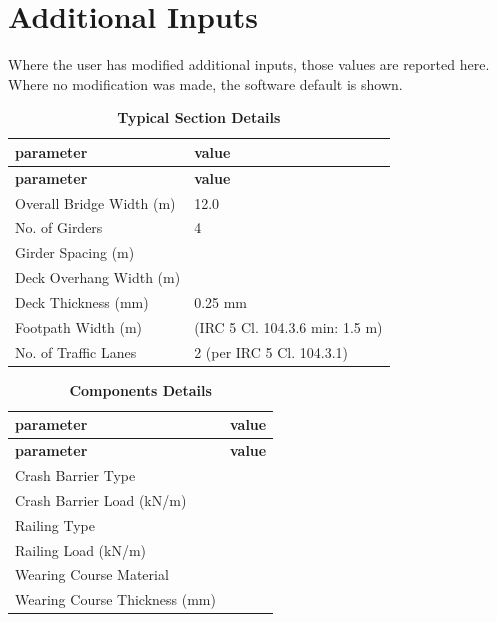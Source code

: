 \documentclass[12pt,a4paper]{report}
\numberwithin{table}{chapter}
\numberwithin{figure}{chapter}
\begin{document}
\newpage
{}
\section{Additional Inputs}
\label{sec:additional-inputs}

Where the user has modified additional inputs, those values are reported here. Where no modification was made, the software default is shown.

\vspace{0.8cm}

\begin{longtable}{|L{5.5cm}|p{10.0cm}|}
\caption{\textbf{Typical Section Details}}
\hline
{} \textbf{parameter} & \textbf{value} \\
\hline
\endfirsthead
\hline
{} \textbf{parameter} & \textbf{value} \\
\hline
\endhead
\textnormal{Overall Bridge Width (m)} & 12.0 \\[6pt]
\hline
\textnormal{No. of Girders} & 4 \\[6pt]
\hline
\textnormal{Girder Spacing (m)} &  \\[6pt]
\hline
\textnormal{Deck Overhang Width (m)} &  \\[6pt]
\hline
\textnormal{Deck Thickness (mm)} & 0.25 mm \\[6pt]
\hline
\textnormal{Footpath Width (m)} &  (IRC 5 Cl. 104.3.6 min: 1.5 m) \\[6pt]
\hline
\textnormal{No. of Traffic Lanes} & 2 (per IRC 5 Cl. 104.3.1) \\[6pt]
\hline
\end{longtable}

\vspace{0.8em}

\begin{longtable}{|L{5.5cm}|p{10.0cm}|}
\caption{\textbf{Components Details}}
\hline
{} \textbf{parameter} & \textbf{value} \\
\hline
\endfirsthead
\hline
{} \textbf{parameter} & \textbf{value} \\
\hline
\endhead
\textnormal{Crash Barrier Type} &  \\[6pt]
\hline
\textnormal{Crash Barrier Load (kN/m)} &  \\[6pt]
\hline

\textnormal{Railing Type} &  \\[6pt]
\hline
\textnormal{Railing Load (kN/m)} &  \\[6pt]
\hline
\textnormal{Wearing Course Material} &  \\[6pt]
\hline
\textnormal{Wearing Course Thickness (mm)} &  \\[6pt]
\hline
\end{longtable}
\end{document}
